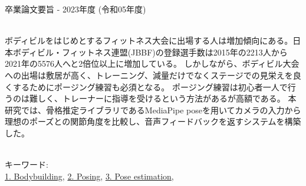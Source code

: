 卒業論文要旨 - 2023年度 (令和05年度)
\begin{center}
\begin{large}
\end{large}
\end{center}

~ \\
  ボディビルをはじめとするフィットネス大会に出場する人は増加傾向にある。日本ボディビル・フィットネス連盟(JBBF)の登録選手数は2015年の2213人から2021年の5576人へと2倍位以上に増加している\cite{jbbf}。
  しかしながら、ボディビル大会への出場は敷居が高く、トレーニング、減量だけでなくステージでの見栄えを良くするためにポージング練習も必須となる。
  ポージング練習は初心者一人で行うのは難しく、トレーナーに指導を受けるという方法があるが高額である。
  本研究では、骨格推定ライブラリであるMediaPipe poseを用いてカメラの入力から理想のポーズとの関節角度を比較し、音声フィードバックを返すシステムを構築した。

~ \\
キーワード:\\
\underline{1. Bodybuilding},
\underline{2. Posing},
\underline{3. Pose estimation},
\begin{flushright}
\dept \\
\author
\end{flushright}

